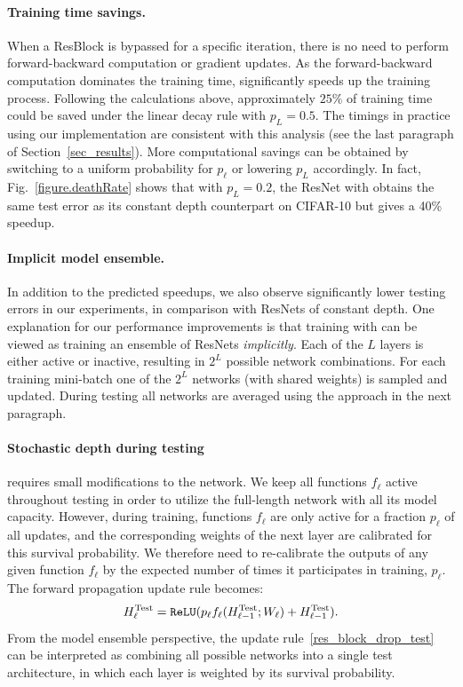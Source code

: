 \paragraph{\textbf{Training time savings}.}
When a ResBlock is bypassed for a specific iteration, there is no need to perform forward-backward computation or gradient updates. As the forward-backward computation dominates the training time, \name{} significantly speeds up the training process. Following the calculations above, approximately $25\%$ of training time could be saved under the linear decay rule with $p_L=0.5$. The timings in practice using our implementation are consistent with this analysis (see the last paragraph of Section~\ref{sec_results}). More computational savings can be obtained by switching to a uniform probability for $p_\ell$ or lowering $p_L$ accordingly. In fact, Fig.~\ref{figure.deathRate} shows that with $p_L=0.2$, the ResNet with \name{} obtains the same test error as its constant depth counterpart on CIFAR-10 but gives a 40\% speedup.

\paragraph{\textbf{Implicit model ensemble}.}
In addition to the predicted speedups, we also observe significantly lower testing errors in our experiments, in comparison with ResNets of constant depth.
One explanation for our performance improvements is that training with \name{} can be viewed as training an ensemble of ResNets \emph{implicitly}.
Each of the $L$ layers is either active or inactive, resulting in $2^L$ possible network combinations. For each training mini-batch one of the $2^L$ networks (with shared weights) is sampled and updated. During testing all networks are averaged using the approach in the next paragraph.

\paragraph{\textbf{Stochastic depth during testing}} requires small modifications to the network. We keep all functions $f_\ell$ active throughout testing in order to utilize the full-length network with all its model capacity. However, during training, functions $f_\ell$ are only active for a fraction $p_\ell$ of all updates, and the corresponding weights of the next layer are calibrated for this survival probability. We therefore need to re-calibrate the outputs of any given function $f_\ell$ by the expected number of times it participates in training, $p_\ell$. The forward propagation update rule becomes:
\begin{equation}
\label{res_block_drop_test}
 H_\ell^\text{Test} = {\tt ReLU} (p_\ell f_\ell(H_{\ell-1}^\text{Test}; W_\ell) +  H_{\ell-1}^\text{Test}).
\end{equation}
From the model ensemble perspective, the update rule~\eqref{res_block_drop_test} can be interpreted as combining all possible networks into a single test architecture, in which each layer is weighted by its survival probability.

